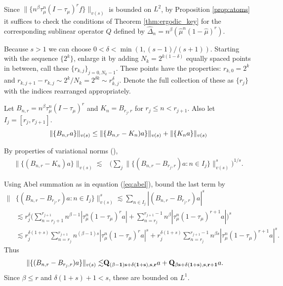 \documentclass[11pt]{amsart}
\theoremstyle{definition}
\theoremstyle{remark}
\begin{document}
\medskip

\\
 Since  $\lVert \{n^{\beta}\tau_{\mu}^n(I-\tau_{\mu})^r f\} \rVert_{v(s)}$ is bounded on $L^2$,  
 by Proposition \ref{prop:atoms} it suffices to check the conditions of 
  Theorem \ref{thm:ergodic_key} for the corresponding sublinear operator $Q$ defined by $\hat \Delta_n=n^{\beta}({\hat \mu}^n(1-\hat \mu)^r)$. 


Because $s>1$ we can choose  $0<\delta<\min(1,(s-1)/(s+1))$. Starting with the sequence $\{2^k\}$, enlarge  it by adding $N_k=2^{k(1-\delta)}$ equally spaced points in between, 
call these $\{r_{k,j}\}_{j=0,N_k-1}$. 
These points have the properties: $r_{k,0}=2^k$ and $r_{k,j+1}-r_{k,j}\sim 2^k/N_k=2^{\delta k}\sim r_{k,j}^{\delta}$.  
Denote the full collection of these as $\{r_j\}$ with the indices rearranged appropriately. 


Let  $B_{n,r}=n^{\beta} \tau_{\mu}^{n}(I-\tau_{\mu})^r$ and 
  $K_n=B_{r_j,r}$ for $r_j\le n<r_{j+1}$. 
  Also let  $I_j=[r_j,r_{j+1}]$.
\[ \lVert \{ B_{n,r}  a\} \rVert_{v(s)} \\
   \le 
 \lVert \{ B_{n,r} -K_n)   a\} \rVert_{v(s)}+\lVert \{K_n a\} \rVert_{v(s)} \]

 By properties of variational norms (\cite{JKRW,JR,JSW}), %
\begin{align*} 
\lVert \{ (B_{n,r} -K_n)   a\} \rVert_{v(s)}  
\lesssim  &  \Big( \sum_j   \lVert\{ (B_{n,r} -B_{r_j,r})   a: n\in I_j \} \rVert_{v(s)}^s  \Big)^{1/s}.    
\end{align*} 


Using Abel summation as in equation (\ref{eq:abel}), bound the last term by
\begin{align*} 
 \lVert & \{ (B_{n,r} -B_{r_j,r})  a : n\in I_j\} \rVert^s_{v(s)} 
  \lesssim  
 \sum_{n\in I_j}    |(B_{n,r} -B_{r_j,r}) a |^s \\
& \lesssim   
 r_j^{\delta} \Big(\sum_{n=r_j+1}^{r_{j+1}}    n^{\beta-1} |\tau_{\mu}^{n} (1-\tau_{\mu})^r a|  + 
\sum_{n=r_j}^{r_{j+1}-1}   n^{\beta}  |\tau_{\mu}^{n}  (1-\tau_{\mu})^{r+1}  a|  \Big)^s \\
& \lesssim   r_j^{\delta(1+s)}  \sum_{n=r_j}^{r_{j+1}}  n^{(\beta-1)s}  |\tau_{\mu}^{n}  (1-\tau_{\mu})^r  a|^s   
+   r_j^{\delta(1+s)} \sum_{n=r_j}^{r_{j+1}-1}   n^{\beta s}  |\tau_{\mu}^{n}  (1-\tau_{\mu})^{r+1}  a|^s   .
  \end{align*}
Thus
\begin{align} \label{eq:B1}
 \lVert \{ (B_{n,r} -B_{r_j,r}) a\} \rVert_{v(s)}
  \lesssim &  {\bf Q_{(\beta-1)s+\delta(1+s),s,r}}a+ {\bf Q_{\beta s+\delta(1+s),s,r+1}}a.
 \end{align}
Since $\beta\le r$ and $\delta(1+s)+1<s$, these are bounded on $L^1$.
\end{document}
